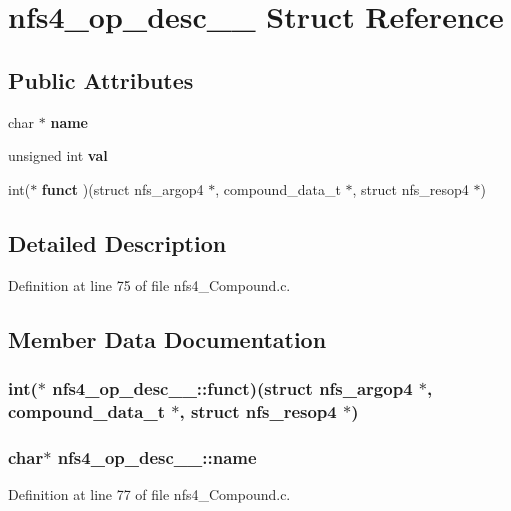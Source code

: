 \section{nfs4\_\-op\_\-desc\_\-\_\- Struct Reference}
\label{structnfs4__op__desc____}
\subsection*{Public Attributes}
\begin{DoxyCompactItemize}
\item 
char $\ast$ {\bf name}
\item 
unsigned int {\bf val}
\item 
int($\ast$ {\bf funct} )(struct nfs\_\-argop4 $\ast$, compound\_\-data\_\-t $\ast$, struct nfs\_\-resop4 $\ast$)
\end{DoxyCompactItemize}


\subsection{Detailed Description}


Definition at line 75 of file nfs4\_\-Compound.c.

\subsection{Member Data Documentation}
\subsubsection[{funct}]{\setlength{\rightskip}{0pt plus 5cm}int($\ast$ {\bf nfs4\_\-op\_\-desc\_\-\_\-::funct})(struct nfs\_\-argop4 $\ast$, compound\_\-data\_\-t $\ast$, struct nfs\_\-resop4 $\ast$)}\label{structnfs4__op__desc_____a84c066ada70589fed546c3b1c90fc781}
\subsubsection[{name}]{\setlength{\rightskip}{0pt plus 5cm}char$\ast$ {\bf nfs4\_\-op\_\-desc\_\-\_\-::name}}\label{structnfs4__op__desc_____a930e0a0f589ae041cf1a6e74e0bcfdbb}


Definition at line 77 of file nfs4\_\-Compound.c.
